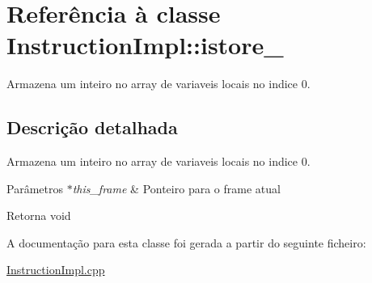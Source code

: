 \hypertarget{class_instruction_impl_1_1istore__0}{}\section{Referência à classe Instruction\+Impl\+:\+:istore\+\_}
\label{class_instruction_impl_1_1istore__0}


Armazena um inteiro no array de variaveis locais no indice 0.  




\subsection{Descrição detalhada}
Armazena um inteiro no array de variaveis locais no indice 0. 


\begin{DoxyParams}{Parâmetros}
{\em $\ast$this\+\_\+frame} & Ponteiro para o frame atual \\
\hline
\end{DoxyParams}
\begin{DoxyReturn}{Retorna}
void 
\end{DoxyReturn}


A documentação para esta classe foi gerada a partir do seguinte ficheiro\+:\begin{DoxyCompactItemize}
\item 
\hyperlink{_instruction_impl_8cpp}{Instruction\+Impl.\+cpp}\end{DoxyCompactItemize}
